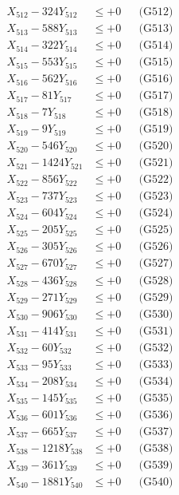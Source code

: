 \documentclass[a4paper,10pt]{article}
\begin{document}
{\begin{align}
X_{512} - 324Y_{512} &\leq +0 && \text{(G512)} \\
X_{513} - 588Y_{513} &\leq +0 && \text{(G513)} \\
X_{514} - 322Y_{514} &\leq +0 && \text{(G514)} \\
X_{515} - 553Y_{515} &\leq +0 && \text{(G515)} \\
X_{516} - 562Y_{516} &\leq +0 && \text{(G516)} \\
X_{517} - 81Y_{517} &\leq +0 && \text{(G517)} \\
X_{518} - 7Y_{518} &\leq +0 && \text{(G518)} \\
X_{519} - 9Y_{519} &\leq +0 && \text{(G519)} \\
X_{520} - 546Y_{520} &\leq +0 && \text{(G520)} \\
\allowbreak
X_{521} - 1424Y_{521} &\leq +0 && \text{(G521)} \\
X_{522} - 856Y_{522} &\leq +0 && \text{(G522)} \\
X_{523} - 737Y_{523} &\leq +0 && \text{(G523)} \\
X_{524} - 604Y_{524} &\leq +0 && \text{(G524)} \\
X_{525} - 205Y_{525} &\leq +0 && \text{(G525)} \\
X_{526} - 305Y_{526} &\leq +0 && \text{(G526)} \\
X_{527} - 670Y_{527} &\leq +0 && \text{(G527)} \\
X_{528} - 436Y_{528} &\leq +0 && \text{(G528)} \\
X_{529} - 271Y_{529} &\leq +0 && \text{(G529)} \\
X_{530} - 906Y_{530} &\leq +0 && \text{(G530)} \\
\allowbreak
X_{531} - 414Y_{531} &\leq +0 && \text{(G531)} \\
X_{532} - 60Y_{532} &\leq +0 && \text{(G532)} \\
X_{533} - 95Y_{533} &\leq +0 && \text{(G533)} \\
X_{534} - 208Y_{534} &\leq +0 && \text{(G534)} \\
X_{535} - 145Y_{535} &\leq +0 && \text{(G535)} \\
X_{536} - 601Y_{536} &\leq +0 && \text{(G536)} \\
X_{537} - 665Y_{537} &\leq +0 && \text{(G537)} \\
X_{538} - 1218Y_{538} &\leq +0 && \text{(G538)} \\
X_{539} - 361Y_{539} &\leq +0 && \text{(G539)} \\
X_{540} - 1881Y_{540} &\leq +0 && \text{(G540)} \\

\end{align}}
\end{document}
